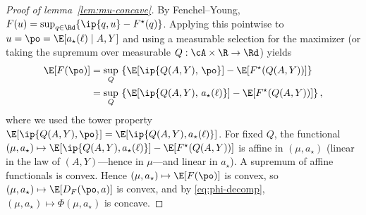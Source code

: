 \begin{proof}[Proof of lemma~\ref{lem:mu-concave}]
    By Fenchel–Young,
    $F(u)=\sup_{q\in\Rd}\{\ip{q,u}-F^\star(q)\}$.
    Applying this pointwise to $u=\po=\E[a_\star(\ell)\mid A,Y]$ and using a measurable
    selection for the maximizer (or taking the supremum over measurable $Q:\cA\times\R\to\Rd$) yields
    \begin{align*}
        \E\!\left[F(\po)\right]
         & = \sup_{Q}\,
        \left\{
        \E\!\left[\ip{Q(A,Y),\,\po}\right] - \E\!\left[F^\star(Q(A,Y))\right]
        \right\}        \\
         & = \sup_{Q}\,
        \left\{
        \E\!\left[\ip{Q(A,Y),\,a_\star(\ell)}\right] - \E\!\left[F^\star(Q(A,Y))\right]
        \right\},
    \end{align*}
    where we used the tower property
    $\E[\ip{Q(A,Y),\po}]=\E[\ip{Q(A,Y),a_\star(\ell)}]$.
    For fixed $Q$, the functional
    \(
    (\mu,a_\star)\mapsto \E[\ip{Q(A,Y),a_\star(\ell)}] - \E[F^\star(Q(A,Y))]
    \)
    is affine in $(\mu,a_\star)$ (linear in the law of $(A,Y)$—hence in $\mu$—and linear in $a_\star$).
    A supremum of affine functionals is convex. Hence
    $(\mu,a_\star)\mapsto \E[F(\po)]$ is convex, so
    $(\mu,a_\star)\mapsto \E[D_F(\po,a)]$ is convex, and by \eqref{eq:phi-decomp},
    $(\mu,a_\star)\mapsto \Phi(\mu,a_\star)$ is concave.
\end{proof}


